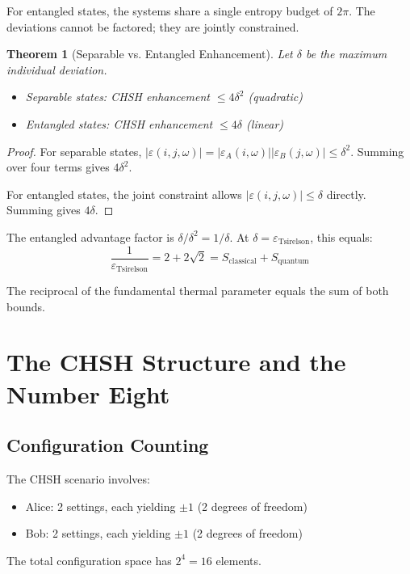 \documentclass[12pt,a4paper]{article}
\newtheorem{theorem}{Theorem}[section]
\newcommand{\eps}{\varepsilon}
\begin{document}
For entangled states, the systems share a single entropy budget of $2\pi$. The deviations cannot be factored; they are jointly constrained.

\begin{theorem}[Separable vs. Entangled Enhancement]
Let $\delta$ be the maximum individual deviation.
\begin{itemize}
\item Separable states: CHSH enhancement $\leq 4\delta^2$ (quadratic)
\item Entangled states: CHSH enhancement $\leq 4\delta$ (linear)
\end{itemize}
\end{theorem}

\begin{proof}
For separable states, $|\eps(i,j,\omega)| = |\eps_A(i,\omega)||\eps_B(j,\omega)| \leq \delta^2$. Summing over four terms gives $4\delta^2$.

For entangled states, the joint constraint allows $|\eps(i,j,\omega)| \leq \delta$ directly. Summing gives $4\delta$.
\end{proof}

The entangled advantage factor is $\delta / \delta^2 = 1/\delta$. At $\delta = \eps_{\text{Tsirelson}}$, this equals:
\begin{equation}
\frac{1}{\eps_{\text{Tsirelson}}} = 2 + 2\sqrt{2} = S_{\text{classical}} + S_{\text{quantum}}
\end{equation}

The reciprocal of the fundamental thermal parameter equals the sum of both bounds.

\section{The CHSH Structure and the Number Eight}

\subsection{Configuration Counting}

The CHSH scenario involves:
\begin{itemize}
\item Alice: 2 settings, each yielding $\pm 1$ (2 degrees of freedom)
\item Bob: 2 settings, each yielding $\pm 1$ (2 degrees of freedom)
\end{itemize}

The total configuration space has $2^4 = 16$ elements.
\end{document}
